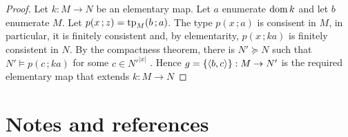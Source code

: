 \documentclass[creche.tex]{subfiles}
\begin{document}
\begin{proof}
Let $k:M\to N$ be an elementary map. Let $a$ enumerate $\mathop{\rm dom} k$ and let $b$ enumerate $M$. Let $p(x\,;z)={\rm tp}_M(b\,;a)$. The type $p(x\,;a)$ is consisent in $M$, in particular, it is finitely consistent and, by elementarity,  $p(x\,;ka)$ is finitely consistent in $N$. By the compactness theorem, there is $N'\succeq N$ such that $N'\models p(c\,;ka)$ for some $c\in N'^{|x|}$ . Hence $g=\{\langle b,c\rangle\}:M\to N'$ is the required elementary map that extends $k:M\to N$ 
\end{proof}
\section{Notes and references}
\begin{biblist}[]\normalsize

   

\end{biblist}
\end{document}
